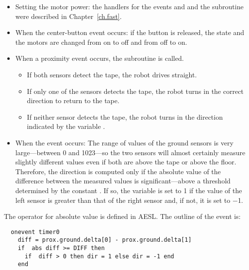 
\begin{itemize}

\item Setting the motor power: the handlers for the events
 and  and the subroutine
 were described in Chapter~\ref{ch.fast}.

\item When the center-button event occurs: if the button is released,
the state and the motors are changed from on to off and from off to on.

\item When a proximity event occurs, the subroutine  is called.
\begin{itemize}
\item If both sensors detect the tape, the robot drives straight.
\item If only one of the sensors detects the tape, the robot turns in
the correct direction to return to the tape.
\item If neither sensor detects the tape, the robot turns in the
direction indicated by the variable .
\end{itemize}

\item When the  event occurs: The range of values of the
ground sensors is very large---between 0 and 1023---so the two
sensors will almost certainly measure slightly different values even if
both are above the tape or above the floor. Therefore, the direction is
computed only if the absolute value of the difference between the
measured values is significant---above a threshold determined by the
constant . If so, the variable  is set to 1 if the value
of the left sensor is greater than that of the right sensor and, if not,
it is set to $-$1.

\end{itemize}

\newpage


The operator for absolute value is defined in AESL. The
outline of the  event is:
\begin{verbatim}
  onevent timer0
    diff = prox.ground.delta[0] - prox.ground.delta[1]
    if  abs diff >= DIFF then
      if  diff > 0 then dir = 1 else dir = -1 end
    end
  \end{verbatim}

